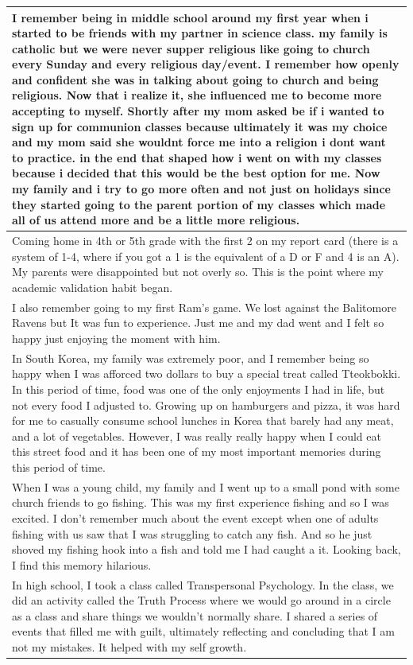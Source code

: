\documentclass[
  .7em,
  letterpaper,
  DIV=11,
  numbers=noendperiod]{scrartcl}
\begin{document}
\begin{table}
\begin{tabular}{l}
I remember being in middle school around my first year when i started to be friends with my partner in science class. my family is catholic but we were never supper religious like going to church every Sunday and every religious day/event. I remember how openly and confident she was in talking about going to church and being religious. Now that i realize it, she influenced me to become more accepting to myself. Shortly after my mom asked be if i wanted to sign up for communion classes because ultimately it was my choice and my mom said she wouldnt force me into a religion i dont want to practice. in the end that shaped how i went on with my classes because i decided that this would be the best option for me. Now my family and i try to go more often and not just on holidays since they started going to the parent portion of my classes which made all of us attend more and be a little more religious.\\
\hline
Coming home in 4th or 5th grade with the first 2 on my report card (there is a system of 1-4, where if you got a 1 is the equivalent of a D or F and 4 is an A). My parents were disappointed but not overly so. This is the point where my academic validation habit began.\\
\hline
I also remember going to my first Ram's game. We lost against the Balitomore Ravens but It was fun to experience. Just me and my dad went and I felt so happy just enjoying the moment with him.\\
\hline
In South Korea, my family was extremely poor, and I remember being so happy when I was afforced two dollars to buy a special treat called Tteokbokki. In this period of time, food was one of the only enjoyments I had in life, but not every food I adjusted to. Growing up on hamburgers and pizza, it was hard for me to casually consume school lunches in Korea that barely had any meat, and a lot of vegetables. However, I was really really happy when I could eat this street food and it has been one of my most important memories during this period of time.\\
\hline
When I was a young child, my family and I went up to a small pond with some church friends to go fishing. This was my first experience fishing and so I was excited. I don’t remember much about the event except when one of adults fishing with us saw that I was struggling to catch any fish. And so he just shoved my fishing hook into a fish and told me I had caught a it. Looking back, I find this memory hilarious.\\
\hline
In high school, I took a class called Transpersonal Psychology. In the class, we did an activity called the Truth Process where we would go around in a circle as a class and share things we wouldn’t normally share. I shared a series of events that filled me with guilt, ultimately reflecting and concluding that I am not my mistakes. It helped with my self growth.\\

\end{tabular}
\end{table}
\end{document}
